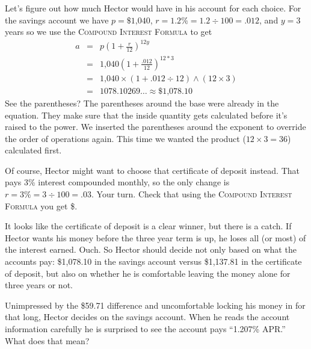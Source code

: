 Let's figure out how much Hector would have in his account for each choice.  For the savings account we have $p=\$\text{1,040}$, $r=1.2\% = 1.2 \div 100 = .012$, and $y = 3$ years so we use the \textsc{Compound Interest Formula} to get
\begin{eqnarray*}
a & = &  p \left( 1 + \frac{r}{12}\right) ^{12y}\\
& = &   \text{1,040} \left( 1 + \frac{.012}{12}\right) ^{12\ast 3}\\
& =  &  \text{1,040} \times ( 1 + .012 \div 12 ) \wedge (12 \times 3) \\
& =  & 1078.10269\ldots  \approx \$\text{1,078.10} 
\end{eqnarray*}
See the parentheses?  The parentheses around the base were already in the equation.  They make sure that the inside quantity gets calculated before it's raised to the power.  We inserted the parentheses around the exponent to override the order of operations again.  This time we wanted the product ($12 \times 3=36$) calculated first.  

Of course, Hector might want to choose that certificate of deposit instead.  That pays 3\% interest compounded monthly, so the only change is  $r=3\% = 3 \div 100 = .03$.  Your turn.  Check that using the \textsc{Compound Interest Formula} you get \$.

It looks like the certificate of deposit is a clear winner, but there is a catch.  If Hector wants his money before the three year term is up, he loses all (or most) of the interest earned. Ouch.  So Hector should decide not only based on what the accounts pay: \$1,078.10 in the savings account versus \$1,137.81 in the certificate of deposit, but also on whether he is comfortable leaving the money alone for three years or not.

Unimpressed by the \$59.71 difference and uncomfortable locking his money in for that long, Hector decides on the savings account. When he reads the account information carefully he is surprised to see the account pays ``1.207\% APR.''  What does that mean?

